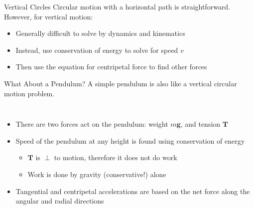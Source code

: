 \documentclass[12pt,compress,aspectratio=169]{beamer}
\begin{document}
\begin{frame}{Vertical Circles}
  Circular motion with a horizontal path is straightforward. However, for
  vertical motion:
  \begin{itemize}
  \item Generally difficult to solve by dynamics and kinematics
  \item Instead, use conservation of energy to solve for speed $v$
  \item Then use the equation for centripetal force to find other forces
  \end{itemize}
\end{frame}



\begin{frame}{What About a Pendulum?}
  A simple pendulum is also like a vertical circular motion problem.

  \vspace{.1in}\begin{columns}

    \begin{itemize}
    \item There are two forces act on the pendulum: weight $m\bm{g}$, and
    tension $\bm{T}$
    \item Speed of the pendulum at any height is found using conservation
      of energy
      \begin{itemize}
      \item $\bm{T}$ is $\perp$ to motion, therefore it does not do work
      \item Work is done by gravity (conservative!) alone
      \end{itemize}
    \item Tangential and centripetal accelerations are based on the net force
      along the angular and radial directions
    \end{itemize}
  \end{columns}
\end{frame}
\end{document}

